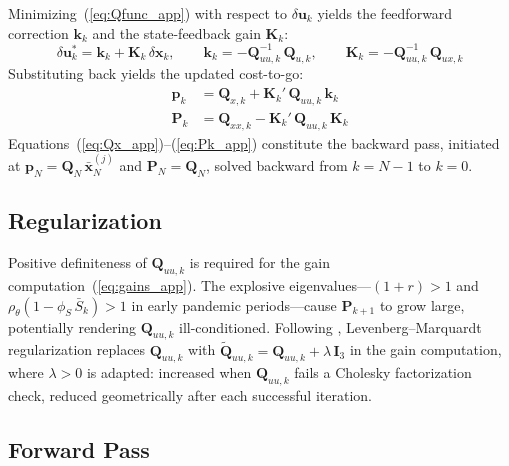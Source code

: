 \documentclass[12pt, a4paper]{article}
\begin{document}
Minimizing~(\ref{eq:Qfunc_app}) with respect to $\delta\bm{u}_k$ yields the
feedforward correction $\bm{k}_k$ and the state-feedback gain $\bm{K}_k$:
%
\begin{equation}
    \delta\bm{u}_k^* = \bm{k}_k + \bm{K}_k\,\delta\bm{x}_k,
    \qquad
    \bm{k}_k = -\bm{Q}_{uu,k}^{-1}\,\bm{Q}_{u,k},
    \qquad
    \bm{K}_k = -\bm{Q}_{uu,k}^{-1}\,\bm{Q}_{ux,k}
    \label{eq:gains_app}
\end{equation}
%
Substituting back yields the updated cost-to-go:
%
\begin{align}
    \bm{p}_k &= \bm{Q}_{x,k} + \bm{K}_k'\,\bm{Q}_{uu,k}\,\bm{k}_k
    \label{eq:pk_app} \\[4pt]
    \bm{P}_k &= \bm{Q}_{xx,k} - \bm{K}_k'\,\bm{Q}_{uu,k}\,\bm{K}_k
    \label{eq:Pk_app}
\end{align}
%
Equations~(\ref{eq:Qx_app})--(\ref{eq:Pk_app}) constitute the backward pass,
initiated at $\bm{p}_N = \bm{Q}_N\,\bar{\bm{x}}_N^{(j)}$ and
$\bm{P}_N = \bm{Q}_N$, solved backward from $k = N-1$ to $k = 0$.

\subsection{Regularization}
\label{app:regularization}

Positive definiteness of $\bm{Q}_{uu,k}$ is required for the gain
computation~(\ref{eq:gains_app}). The explosive eigenvalues---$(1+r) > 1$ and
$\rho_\theta(1-\phi_S\,\bar{S}_k) > 1$ in early pandemic periods---cause
$\bm{P}_{k+1}$ to grow large, potentially rendering $\bm{Q}_{uu,k}$
ill-conditioned. Following \citet{tassa2014control}, Levenberg--Marquardt
regularization replaces $\bm{Q}_{uu,k}$ with
$\tilde{\bm{Q}}_{uu,k} = \bm{Q}_{uu,k} + \lambda\,\bm{I}_3$ in the gain
computation, where $\lambda > 0$ is adapted: increased when $\bm{Q}_{uu,k}$
fails a Cholesky factorization check, reduced geometrically after each
successful iteration.

\subsection{Forward Pass}
\label{app:forward}
\end{document}
